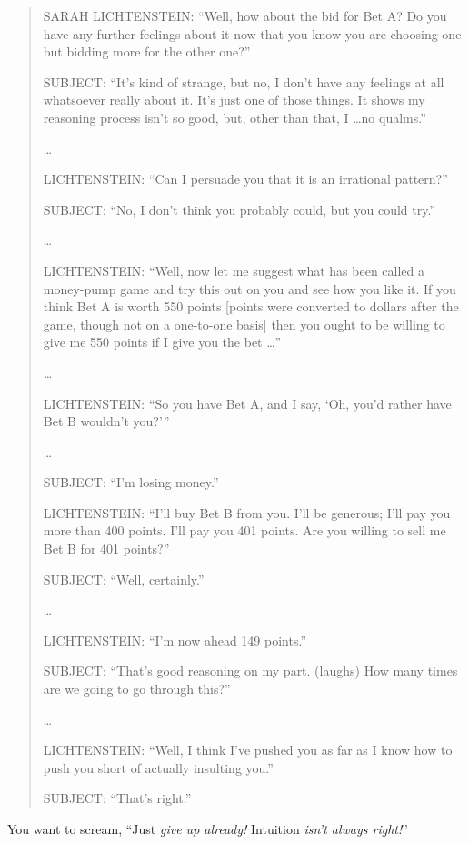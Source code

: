 \begin{quotation}
{
 SARAH LICHTENSTEIN: ``Well, how about the bid for
Bet A? Do you have any further feelings about it now that you know you
are choosing one but bidding more for the other
one?''}

{
 SUBJECT: ``It's kind of strange,
but no, I don't have any feelings at all whatsoever
really about it. It's just one of those things. It
shows my reasoning process isn't so good, but, other
than that, I \ldots no qualms.''}

{
 \ldots}

{
 LICHTENSTEIN: ``Can I persuade you that it is an
irrational pattern?''}

{
 SUBJECT: ``No, I don't think you
probably could, but you could try.''}

{
 \ldots}

{
 LICHTENSTEIN: ``Well, now let me suggest what has
been called a money-pump game and try this out on you and see how you
like it. If you think Bet A is worth 550 points [points were converted
to dollars after the game, though not on a one-to-one basis] then you
ought to be willing to give me 550 points if I give you the bet
\ldots''}

{
 \textit{\ldots}}

{
 LICHTENSTEIN: ``So you have Bet A, and I say,
`Oh, you'd rather have Bet B
wouldn't you?'''}

{
 \ldots}

{
 SUBJECT: ``I'm losing
money.''}

{
 LICHTENSTEIN: ``I'll buy Bet B
from you. I'll be generous; I'll pay
you more than 400 points. I'll pay you 401 points. Are
you willing to sell me Bet B for 401 points?''}

{
 SUBJECT: ``Well, certainly.''}

{
 \ldots}

{
 LICHTENSTEIN: ``I'm now ahead 149
points.''}

{
 SUBJECT: ``That's good reasoning
on my part. (laughs) How many times are we going to go through
this?''}

{
 \ldots}

{
 LICHTENSTEIN: ``Well, I think
I've pushed you as far as I know how to push you short
of actually insulting you.''}

{
 SUBJECT: ``That's
 right.''}
\end{quotation}

{
 You want to scream, ``Just \textit{give up
already!} Intuition \textit{isn't always
right!}''}

